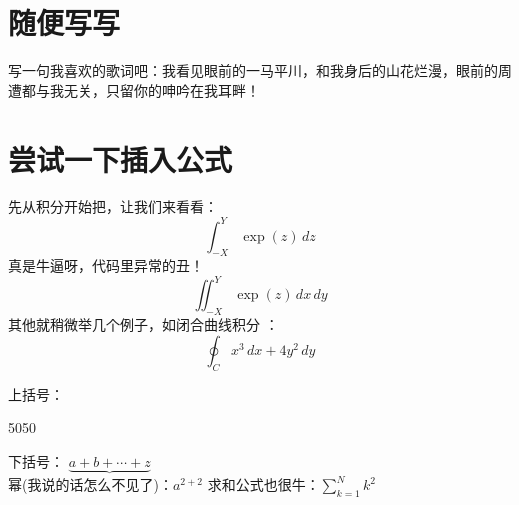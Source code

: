 	\section{随便写写}
	写一句我喜欢的歌词吧：我看见眼前的一马平川，和我身后的山花烂漫，眼前的周遭都与我无关，只留你的呻吟在我耳畔！
	\section{尝试一下插入公式}
	先从积分开始把，让我们来看看：\begin{equation*}\int_{-X}^{Y} \exp(z)\, dz\end{equation*}
	真是牛逼呀，代码里异常的丑！	\begin{equation*}\iint_{-X}^{Y} \exp(z)\, dx\,dy\end{equation*}
	其他就稍微举几个例子，如闭合曲线积分 ：\begin{equation*}\oint_{C} x^3\, dx + 4y^2\, dy\end{equation*}
	
	上括号：\begin{matrix} 5050 \\  \end{matrix}    下括号： $\underbrace{a+b+\cdots+z}$
	\\ 幂(我说的话怎么不见了)：$a^{2+2}$        求和公式也很牛：$\sum_{k=1}^N k^2$
	
	


